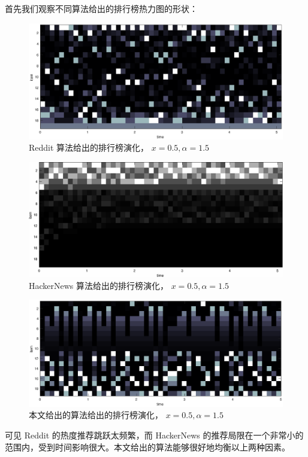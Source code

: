 \documentclass[UTF8]{ctexart}
\theoremstyle{plain}
\theoremstyle{definition}
\theoremstyle{remark}
\begin{document}
	首先我们观察不同算法给出的排行榜热力图的形状：
	\begin{figure}[h!] 
		\centering
		\includegraphics[width = \linewidth]{../model/douhu/pic/reddit-heatmap.eps}
		\caption{Reddit 算法给出的排行榜演化， $x=0.5, \alpha=1.5$}\label{fig:reddit-heatmap}
	\end{figure}

	\begin{figure}[h!] 
		\centering
		\includegraphics[width = \linewidth]{../model/douhu/pic/hackerNews-heatmap.eps}
		\caption{HackerNews 算法给出的排行榜演化， $x=0.5, \alpha=1.5$}\label{fig:hackerNews-heatmap}
	\end{figure}
	
	\begin{figure}[h!] 
		\centering
		\includegraphics[width = \linewidth]{../model/douhu/pic/ours-heatmap.eps}
		\caption{本文给出的算法给出的排行榜演化， $x=0.5, \alpha=1.5$}\label{fig:ours-heatmap}
	\end{figure}
	可见 Reddit 的热度推荐跳跃太频繁，而 HackerNews 的推荐局限在一个非常小的范围内，受到时间影响很大。本文给出的算法能够很好地均衡以上两种因素。
	
\end{document}
